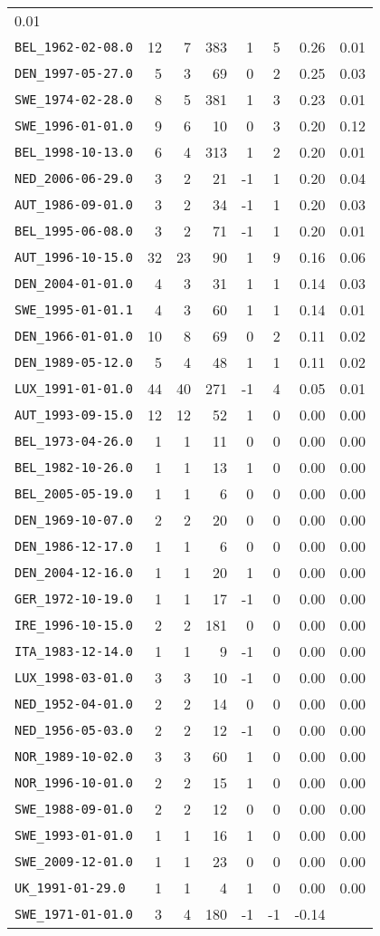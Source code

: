 \documentclass[]{article}
\begin{document}
\begin{longtable}[c]{@{}lrrrrrrr@{}}
0.01\tabularnewline
\texttt{BEL\_1962-02-08.0} & 12 & 7 & 383 & 1 & 5 & 0.26 &
0.01\tabularnewline
\texttt{DEN\_1997-05-27.0} & 5 & 3 & 69 & 0 & 2 & 0.25 &
0.03\tabularnewline
\texttt{SWE\_1974-02-28.0} & 8 & 5 & 381 & 1 & 3 & 0.23 &
0.01\tabularnewline
\texttt{SWE\_1996-01-01.0} & 9 & 6 & 10 & 0 & 3 & 0.20 &
0.12\tabularnewline
\texttt{BEL\_1998-10-13.0} & 6 & 4 & 313 & 1 & 2 & 0.20 &
0.01\tabularnewline
\texttt{NED\_2006-06-29.0} & 3 & 2 & 21 & -1 & 1 & 0.20 &
0.04\tabularnewline
\texttt{AUT\_1986-09-01.0} & 3 & 2 & 34 & -1 & 1 & 0.20 &
0.03\tabularnewline
\texttt{BEL\_1995-06-08.0} & 3 & 2 & 71 & -1 & 1 & 0.20 &
0.01\tabularnewline
\texttt{AUT\_1996-10-15.0} & 32 & 23 & 90 & 1 & 9 & 0.16 &
0.06\tabularnewline
\texttt{DEN\_2004-01-01.0} & 4 & 3 & 31 & 1 & 1 & 0.14 &
0.03\tabularnewline
\texttt{SWE\_1995-01-01.1} & 4 & 3 & 60 & 1 & 1 & 0.14 &
0.01\tabularnewline
\texttt{DEN\_1966-01-01.0} & 10 & 8 & 69 & 0 & 2 & 0.11 &
0.02\tabularnewline
\texttt{DEN\_1989-05-12.0} & 5 & 4 & 48 & 1 & 1 & 0.11 &
0.02\tabularnewline
\texttt{LUX\_1991-01-01.0} & 44 & 40 & 271 & -1 & 4 & 0.05 &
0.01\tabularnewline
\texttt{AUT\_1993-09-15.0} & 12 & 12 & 52 & 1 & 0 & 0.00 &
0.00\tabularnewline
\texttt{BEL\_1973-04-26.0} & 1 & 1 & 11 & 0 & 0 & 0.00 &
0.00\tabularnewline
\texttt{BEL\_1982-10-26.0} & 1 & 1 & 13 & 1 & 0 & 0.00 &
0.00\tabularnewline
\texttt{BEL\_2005-05-19.0} & 1 & 1 & 6 & 0 & 0 & 0.00 &
0.00\tabularnewline
\texttt{DEN\_1969-10-07.0} & 2 & 2 & 20 & 0 & 0 & 0.00 &
0.00\tabularnewline
\texttt{DEN\_1986-12-17.0} & 1 & 1 & 6 & 0 & 0 & 0.00 &
0.00\tabularnewline
\texttt{DEN\_2004-12-16.0} & 1 & 1 & 20 & 1 & 0 & 0.00 &
0.00\tabularnewline
\texttt{GER\_1972-10-19.0} & 1 & 1 & 17 & -1 & 0 & 0.00 &
0.00\tabularnewline
\texttt{IRE\_1996-10-15.0} & 2 & 2 & 181 & 0 & 0 & 0.00 &
0.00\tabularnewline
\texttt{ITA\_1983-12-14.0} & 1 & 1 & 9 & -1 & 0 & 0.00 &
0.00\tabularnewline
\texttt{LUX\_1998-03-01.0} & 3 & 3 & 10 & -1 & 0 & 0.00 &
0.00\tabularnewline
\texttt{NED\_1952-04-01.0} & 2 & 2 & 14 & 0 & 0 & 0.00 &
0.00\tabularnewline
\texttt{NED\_1956-05-03.0} & 2 & 2 & 12 & -1 & 0 & 0.00 &
0.00\tabularnewline
\texttt{NOR\_1989-10-02.0} & 3 & 3 & 60 & 1 & 0 & 0.00 &
0.00\tabularnewline
\texttt{NOR\_1996-10-01.0} & 2 & 2 & 15 & 1 & 0 & 0.00 &
0.00\tabularnewline
\texttt{SWE\_1988-09-01.0} & 2 & 2 & 12 & 0 & 0 & 0.00 &
0.00\tabularnewline
\texttt{SWE\_1993-01-01.0} & 1 & 1 & 16 & 1 & 0 & 0.00 &
0.00\tabularnewline
\texttt{SWE\_2009-12-01.0} & 1 & 1 & 23 & 0 & 0 & 0.00 &
0.00\tabularnewline
\texttt{UK\_1991-01-29.0} & 1 & 1 & 4 & 1 & 0 & 0.00 &
0.00\tabularnewline
\texttt{SWE\_1971-01-01.0} & 3 & 4 & 180 & -1 & -1 & -0.14 &

\end{longtable}
\end{document}
